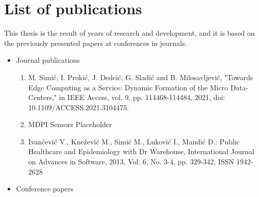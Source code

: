\chapter*{List of publications}
%
This thesis is the result of years of research and development, and it is based on the previously presented papers at conferences in journals.

\begin{itemize}
	
	\item Journal publications
	
	\begin{enumerate}[start=1,label={(\bfseries \arabic*)}]
		\item M. Simić, I. Prokić, J. Dedeić, G. Sladić and B. Milosavljević, "Towards Edge Computing as a Service: Dynamic Formation of the Micro Data-Centers," in IEEE Access, vol. 9, pp. 114468-114484, 2021, doi: 10.1109/ACCESS.2021.3104475.
		\item MDPI Sensors Placeholder
		\item  Ivančević V., Knežević M., Simić M., Luković I., Mandić D.:  Public Healthcare and Epidemiology with Dr Warehouse, International Journal on Advances in Software, 2013, Vol. 6, No. 3-4, pp. 329-342, ISSN 1942-2628
	\end{enumerate}
	
	\item Conference papers
	

\end{itemize}
